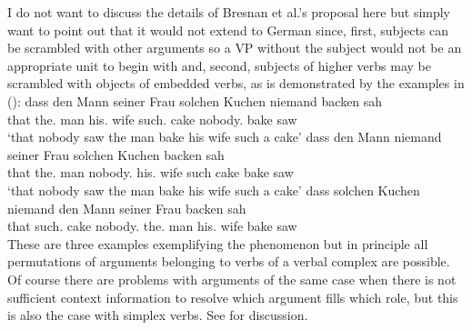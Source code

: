 I do not want to discuss the details of Bresnan et al.'s proposal here but simply want
to point out that it would not extend to German since, first, subjects can be scrambled with other
arguments so a VP without the subject would not be an appropriate unit to begin with and, second,
subjects of higher verbs may be scrambled with objects of embedded verbs, as is demonstrated by the
examples in ():
\largerpage
\eal
\ex 
\gll dass den Mann       seiner Frau     solchen Kuchen niemand backen sah\\
     that the.\acc{} man his.\dat{} wife such.\acc{} cake nobody.\nom{} bake saw\\
\glt `that nobody saw the man bake his wife such a cake'
\ex 
\gll dass den        Mann niemand seiner Frau solchen Kuchen backen sah\\
     that the.\acc{} man  nobody.\nom{} his.\dat{} wife such cake bake saw\\
\glt `that nobody saw the man bake his wife such a cake'
\ex
\gll dass solchen Kuchen niemand den Mann seiner Frau backen sah\\
     that such.\acc{} cake nobody.\nom{} the.\acc{} man his.\dat{} wife bake saw\\
\zl
These are three examples exemplifying the phenomenon but in principle all permutations of
arguments belonging to verbs of a verbal complex are possible. Of course there are problems with
arguments of the same case when there is not sufficient context information to resolve which
argument fills which role, but this is also the case with simplex verbs. See  for discussion.
  
